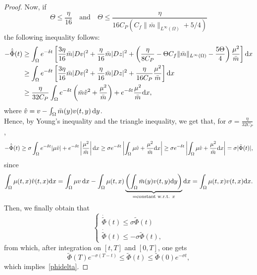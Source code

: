 \documentclass[10pt,a4paper,nouppercase,nowrite]{article}
\numberwithin{equation}{section}
\newcommand{\di}{{\rm d}}
\theoremstyle{definition}
\begin{document}
\begin{proof}
		Now, if $$\Theta \le \frac\eta{16} \quad \text{and} \quad \Theta \le \frac{\eta}{16C_P(C_f \|\bar{m}\|_{L^{\infty}(\Omega)} + 5/4)}$$ the following inequality follows:
		\begin{equation}\label{part3}
			\begin{split}
				-\dot{\tilde{\Phi}}(t) & \geq \int_{\Omega} e^{-\delta t}  \left[ \frac{3\eta}{16} \bar{m} |Dv|^2+  \frac\eta{16}  \bar{m} |Dz|^2 +\left(\frac{\eta}{8C_P}- \Theta C_f \|\bar{m}\|_{L^{\infty}(\Omega)} -\frac{5\Theta}{4} \right) \frac{\mu^2}{\bar{m}} \right] \di x \\
				& \geq \int_{\Omega} e^{-\delta t}  \left[ \frac{3\eta}{16} \bar{m} |Dv|^2+  \frac\eta{16}  \bar{m} |Dz|^2+ \frac{\eta}{16C_P} \frac{\mu^2}{\bar{m}} \right] \di x \\
				& \geq \frac{\eta}{32 C_P} \int_{\Omega} e^{-\delta t} \left( \bar{m}\hat{v}^2 + \frac{\mu^2}{\bar{m}} \right) + e^{-\delta t} \frac{\mu^2}{\bar{m}} \di x,
			\end{split}
		\end{equation}
		where $\hat{v}=v-\int_{\Omega} \bar{m}(y) v(t,y) \, \di y$. \\
		Hence, by Young's inequality and the triangle inequality, we get that, for $\sigma = \frac{\eta}{32 C_P}$,
		\begin{equation*}
			-\dot{\tilde{\Phi}}(t) \geq \sigma \int_{\Omega} e^{-\delta t} |\mu \hat{v}| + e^{-\delta t} \left| \frac{\mu^2}{\bar{m}} \right| \di x \geq \sigma e^{-\delta t} \left| \int_{\Omega} \mu \hat{v} + \frac{\mu^2}{\bar{m}} \di x \right| \geq \sigma e^{-\delta t} \left| \int_{\Omega} \mu \hat{v} + \frac{\mu^2}{\bar{m}} \di x \right| = \sigma |\tilde{\Phi}(t)|,
		\end{equation*}
		since
		\begin{equation*}
			\int_{\Omega} \mu(t,x)\hat{v}(t,x) \di x = \int_{\Omega} \mu v \, \di x - \int_{\Omega} \mu(t,x) \underbrace{\left( \int_{\Omega} \bar{m}(y)v(t,y) \di y \right)}_{=\text{constant w.r.t. } x} \di x = \int_{\Omega} \mu(t,x) v(t,x) \di x.
		\end{equation*}
		Then, we finally obtain that
		\begin{equation*}
			\begin{cases}
				\dot{\tilde{\Phi}}(t) \le \sigma \tilde{\Phi}(t) \\
				\dot{\tilde{\Phi}}(t) \le -\sigma \tilde{\Phi}(t),
			\end{cases}
		\end{equation*}
		from which, after integration on $[t,T]$ and $[0,T]$, one gets
		\begin{equation}\label{tildephiineq}
			\tilde{\Phi}(T) e^{-\sigma(T-t)} \le \tilde{\Phi}(t) \le \tilde{\Phi}(0) e^{-\sigma t},
		\end{equation}
		which implies~\eqref{phidelta}.
		

\end{proof}
\end{document}
